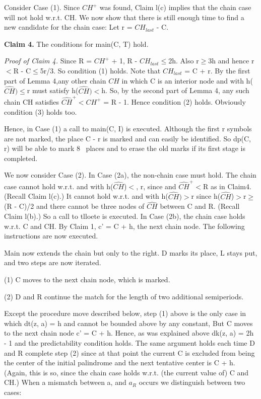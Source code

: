 \documentclass[11pt,a4paper]{report}
\begin{document}
Consider Case (1). Since $CH^{+}$ was found, Claim l(c) implies that the chain case will
not hold w.r.t. CH. We now show that there is still enough time to find a new candidate
for the chain case: Let r = $CH_{last}$ - C.

\textbf{Claim 4.} The conditions for main(C, T) hold.

\emph{Proof of Claim 4.} Since R = $CH^{+}$ + 1, R - $CH_{last}\leq$2h. Also r$\geq$3h and hence r$<$R -
C$\leq$5r/3. So condition (1) holds. Note that $CH_{last}$ = C + r. By the first part of Lemma
4,any other chain $\hat{CH}$ in which C is an interior node and with h($\hat{CH})\leq$r must satisfy
h($\hat{CH})<$h. So, by the second part of Lemma 4, any such chain CH satisfies 
$\hat{CH}^{+} < CH^{+}$ = R - 1. Hence condition (2) holds. Obviously condition (3) holds too. 

Hence, in Case (1) a call to main(C, I) is executed. Although the first r symbols are
not marked, the place C - r is marked and can easily be identified. So dp(C, r) will be
able to mark 8~ places and to erase the old marks if its first stage is completed.

We now consider Case (2). In Case (2a), the non-chain case must hold. The chain case
cannot hold w.r.t.  and with h($\hat{CH}$)$<$, r, since  and $\hat{CH}^{+}<$R as in Claim4. (Recall Claim l(c).)
It cannot hold w.r.t.  and  with h($\hat{CH})>$r since h($\hat{CH}$)$>$r$\geq$(R - C)/2 and there
cannot be three nodes of $\hat{CH}$ between C and R. (Recall Claim l(b).) So a call to tlloete is
executed. In Case (2b), the chain case holds w.r.t. C and CH. By Claim 1, c’ = C + h,
the next chain node. The following instructions are now executed.

Main now extends the chain but only to the right. D marks its place, L stays put, and
two steps are now iterated.

(1) C moves to the next chain node, which is marked.

(2) D and R continue the match for the length of two additional semiperiods.

Except the procedure move described below, step (1) above is the only case in which
dt(z, a) = h and cannot be bounded above by any constant, But C moves to the next
chain node c’ = C + h. Hence, as was explained above dk(z, a) = 2h - 1 and the
predictability condition holds. The same argument holds each time D and R complete
step (2) since at that point the current C is excluded from being the center of the initial
palindrome and the next tentative center is C + h. (Again, this is so, since the chain case 
holds w.r.t. (the current value of) C and CH.) When a mismatch between a, and $a_R$
occurs we distinguish between two cases:
\end{document}
